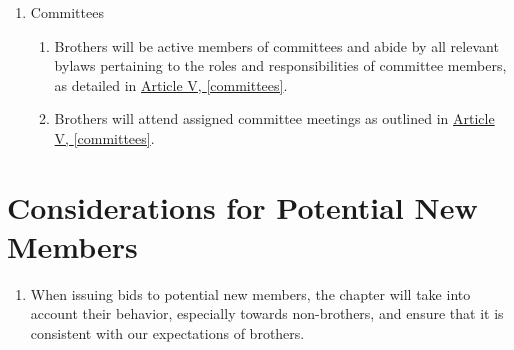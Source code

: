 \begin{enumerate}
\begin{enumerate}
\begin{enumerate}
						\item A brother who has three unexcused mandatory events in a row must be brought up for standards by the Secretary with the possibility of suspension

						\item A brother who has three unexcused mandatory events throughout the semester will be staggard.

						\item A brother who has four unexcused mandatory events throughout the semester will be placed on probation until the end of the semester.

						\item A brother who has seven or more unexcused mandatory events throughout the semester will be brought up for standards by the Secretary with the possibility of suspension.
					\end{enumerate}

				\item Brothers will attend chapter meetings as outlined in \hyperref[attendance]{Article III, \autoref*{attendance}}.
			\end{enumerate}

		\item Committees
			\begin{enumerate}
				\item Brothers will be active members of committees and abide by all relevant bylaws pertaining to the roles and responsibilities of committee members, as detailed in \hyperref[committees]{Article V, \autoref*{committees}}.
				\item Brothers will attend assigned committee meetings as outlined in \hyperref[committees]{Article V, \autoref*{committees}}.
			\end{enumerate}

	\end{enumerate}
	
\section{Considerations for Potential New Members}
	\begin{enumerate}
		\item When issuing bids to potential new members, the chapter will take into account their behavior, especially towards non-brothers, and ensure that it is consistent with our expectations of brothers.
	\end{enumerate}

